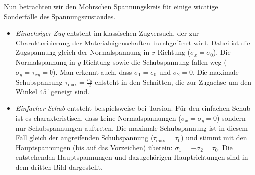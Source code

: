 \documentclass{lecture}
\begin{document}
    Nun betrachten wir den Mohrschen Spannungskreis für einige wichtige Sonderfälle des Spannungszustandes.
    \begin{itemize}
        \item \emph{Einachsiger Zug} entsteht im klassischen Zugversuch, der zur Charakterisierung der Materialeigenschaften durchgeführt wird.
        Dabei ist die Zugspannung gleich der Normalspannung in \(x\)-Richtung (\(\sigma_x = \sigma_0\)).
        Die Normalspannung in \(y\)-Richtung sowie die Schubspannung fallen weg (\(\sigma_y = \tau_{xy} = 0\)).
        Man erkennt auch, dass \(\sigma_1 = \sigma_0\) und \(\sigma_2 = 0\).
        Die maximale Schubspannung \(\tau_{\text{max}} = \frac{\sigma_0}{2}\) entsteht in den Schnitten, die zur Zugachse um den Winkel \(45^\circ\) geneigt sind.
        \begin{center}
            \hspace{2cm}
        \end{center}
        \item \emph{Einfacher Schub} entsteht beispielsweise bei Torsion.
        Für den einfachen Schub ist es charakteristisch, dass keine Normalspannungen (\(\sigma_x = \sigma_y = 0\)) sondern nur Schubspannungen auftreten.
        Die maximale Schubspannung ist in diesem Fall gleich der angreifenden Schubspannung (\(\tau_{\text{max}} = \tau_0\)) und stimmt mit den Hauptspannungen (bis auf das Vorzeichen) überein: \(\sigma_1 = -\sigma_2 = \tau_0\).
        Die entstehenden Hauptspannungen und dazugehörigen Hauptrichtungen sind in dem dritten Bild dargestellt.

\end{itemize}
\end{document}

